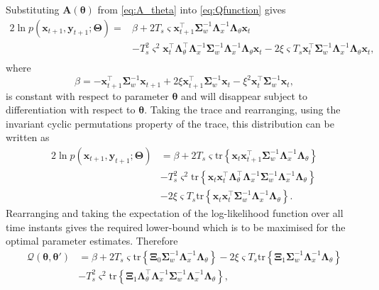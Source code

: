 \documentclass[11pt,draftcls,onecolumn,peerreview]{IEEEtran}
\begin{document}
Substituting $\mathbf A( \boldsymbol\theta)$ from \eqref{eq:A_theta} into \eqref{eq:Qfunction} gives
\begin{align}
2\ln p(\mathbf x_{t+1}, \mathbf y_{t+1};\boldsymbol\Theta)=&\beta+2 T_s\varsigma\mathbf x_{t+1}^\top\boldsymbol\Sigma_w^{-1}\boldsymbol\Lambda_x^{-1}\boldsymbol\Lambda_{\theta}\mathbf x_t \nonumber \\
&-T_s^2\varsigma^2\mathbf x_t^\top \boldsymbol\Lambda_{\theta}^\top\boldsymbol\Lambda_x^{-1}\boldsymbol\Sigma_w^{-1}\boldsymbol\Lambda_x^{-1}\boldsymbol\Lambda_{\theta}\mathbf x_t-2\xi \varsigma T_s\mathbf x_t^\top\boldsymbol\Sigma_w^{-1}\boldsymbol\Lambda_x^{-1}\boldsymbol\Lambda_{\theta}\mathbf x_t,\nonumber \\
\end{align}
where 
\begin{equation}
\beta=-\mathbf x_{t+1}^\top\boldsymbol\Sigma_w^{-1}\mathbf x_{t+1}+2\xi\mathbf x_{t+1}^\top\boldsymbol\Sigma_w^{-1}\mathbf x_t-\xi^2\mathbf x_t^\top\boldsymbol\Sigma_w^{-1}\mathbf x_t,
\end{equation}
is constant with respect to parameter $\boldsymbol\theta$ and will disappear subject to differentiation with respect to $\boldsymbol\theta$. Taking the trace and rearranging, using the invariant cyclic permutations property of the trace, this distribution can be written as
\begin{align}\label{eq:Qfunctionintrace}
2\ln p(\mathbf x_{t+1}, \mathbf y_{t+1};\boldsymbol\Theta)&=\beta+2 T_s\varsigma\mathrm{tr} \left\lbrace \mathbf x_t\mathbf x_{t+1}^\top\boldsymbol\Sigma_w^{-1}\boldsymbol\Lambda_x^{-1}\boldsymbol\Lambda_{\theta}\right\rbrace \nonumber \\
&-T_s^2\varsigma^2\mathrm{tr} \left\lbrace \mathbf x_t\mathbf x_t^\top \boldsymbol\Lambda_{\theta}^\top\boldsymbol\Lambda_x^{-1}\boldsymbol\Sigma_w^{-1}\boldsymbol\Lambda_x^{-1}\boldsymbol\Lambda_{\theta}\right\rbrace\nonumber \\
&-2\xi\varsigma T_s\mathrm{tr} \left\lbrace \mathbf x_t\mathbf x_{t}^\top\boldsymbol\Sigma_w^{-1}\boldsymbol\Lambda_x^{-1}\boldsymbol\Lambda_{\theta}\right\rbrace.
\end{align}
Rearranging and taking the expectation of the log-likelihood function over all time instants gives the required lower-bound which is to be maximised for the optimal parameter estimates. Therefore 
\begin{align}\label{eq:MRA-QintermsofTraces}
\mathcal Q(\boldsymbol \theta, \boldsymbol\theta')&=\beta+2 T_s\varsigma\mathrm{tr} \left\lbrace \boldsymbol \Xi_0\boldsymbol\Sigma_w^{-1}\boldsymbol\Lambda_x^{-1}\boldsymbol\Lambda_{\theta}\right\rbrace-2\xi\varsigma T_s\mathrm{tr} \left\lbrace \boldsymbol\Xi_1\boldsymbol\Sigma_w^{-1}\boldsymbol\Lambda_x^{-1}\boldsymbol\Lambda_{\theta}\right\rbrace \nonumber \\
&-T_s^2\varsigma^2\mathrm{tr} \left\lbrace \boldsymbol\Xi_1 \boldsymbol\Lambda_{\theta}^\top\boldsymbol\Lambda_x^{-1}\boldsymbol\Sigma_w^{-1}\boldsymbol\Lambda_x^{-1}\boldsymbol\Lambda_{\theta}\right\rbrace,
\end{align}
\end{document}

